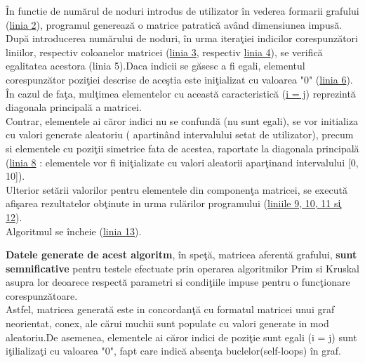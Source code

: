 \documentclass[14pt]{article}
\begin{document}
\^In functie de num\u{a}rul de noduri introdus de utilizator \^in vederea formarii grafului (\underline{linia 2}), programul genereaz\u{a} o matrice patratic\u{a} av\^and dimensiunea impus\u{a}.\\

Dup\u{a} introducerea num\u{a}rului de noduri, \^in urma itera\c tiei indicilor corespunz\u{a}tori liniilor, respectiv coloanelor matricei (\underline{linia 3}, respectiv \underline{linia 4}), se verific\u{a} egalitatea acestora (linia 5).Daca indicii se g\u{a}sesc a fi egali, elementul corespunz\u{a}tor pozi\c tiei descrise de ace\c stia este ini\c tializat cu valoarea "0" (\underline{linia 6}).\\

\^In cazul de fa\c ta, mul\c timea elementelor cu aceast\u{a} caracteristic\u{a} (\underline{i = j}) reprezint\u{a} diagonala principal\u{a} a matricei.\\

Contrar, elementele ai c\u{a}ror indici nu se confund\u{a} (nu sunt egali), se vor initializa cu valori generate aleatoriu ( apartin\^and intervalului setat de utilizator), precum si elementele cu pozi\c tii simetrice fata de acestea, raportate la diagonala principal\u{a} (\underline{linia 8} : elementele vor fi ini\c tializate cu valori aleatorii apar\c tinand intervalului [0, 10]).\\

Ulterior set\u{a}rii valorilor pentru elementele din componen\c ta matricei, se execut\u{a} afi\c sarea rezultatelor ob\c tinute in urma rul\u{a}rilor programului (\underline{liniile 9, 10, 11 s\c i 12}).\\

Algoritmul se \^incheie (\underline{linia 13}).\\

\vspace{2mm}

\textbf{Datele generate de acest algoritm}, \^in spe\c t\u{a}, matricea aferent\u{a} grafului, \textbf{sunt semnificative} pentru testele efectuate prin operarea algoritmilor Prim si Kruskal asupra lor deoarece respect\u{a} parametri si condi\c tiile impuse pentru o func\c tionare corespunz\u{a}toare.\\

Astfel, matricea generat\u{a} este in concordan\c t\u{a} cu formatul matricei unui graf neorientat, conex, ale c\u{a}rui muchii sunt populate cu valori generate in mod aleatoriu.De asemenea, elementele ai c\u{a}ror indici de pozi\c tie sunt egali (i = j) sunt i\c tilializa\c ti cu valoarea "0", fapt care indic\u{a} absen\c ta buclelor(self-loops) \^in graf.\\
\end{document}
